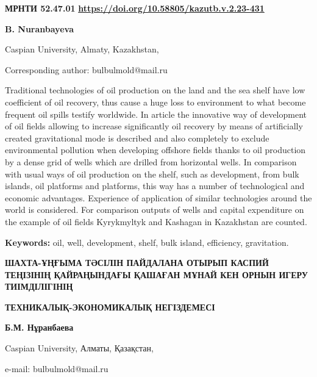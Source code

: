 \newpage
{\bfseries МРНТИ 52.47.01}
\hfill {\bfseries \href{https://doi.org/10.58805/kazutb.v.2.23-431}{https://doi.org/10.58805/kazutb.v.2.23-431}}


\begin{center}
{\bfseries B. Nuranbayeva}

Caspian University, Almaty, Kazakhstan,

\envelope Corresponding author: bulbulmold@mail.ru
\end{center}

Traditional technologies of oil production on the land and the sea shelf
have low coefficient of oil recovery, thus cause a huge loss to
environment to what become frequent oil spills testify worldwide. In
article the innovative way of development of oil fields allowing to
increase significantly oil recovery by means of artificially created
gravitational mode is described and also completely to exclude
environmental pollution when developing offshore fields thanks to oil
production by a dense grid of wells which are drilled from horizontal
wells. In comparison with usual ways of oil production on the shelf,
such as development, from bulk islands, oil platforms and platforms,
this way has a number of technological and economic advantages.
Experience of application of similar technologies around the world is
considered. For comparison outputs of wells and capital expenditure on
the example of oil fields Kyrykmyltyk and Kashagan in Kazakhstan are
counted.

{\bfseries Keywords:} oil, well, development, shelf, bulk island,
efficiency, gravitation.

\begin{center}
{\large\bfseries ШАХТА-ҰҢҒЫМА ТӘСІЛІН ПАЙДАЛАНА ОТЫРЫП КАСПИЙ ТЕҢІЗІНІҢ
ҚАЙРАҢЫНДАҒЫ ҚАШАҒАН МҰНАЙ КЕН ОРНЫН ИГЕРУ ТИІМДІЛІГІНІҢ}

{\bfseries ТЕХНИКАЛЫҚ-ЭКОНОМИКАЛЫҚ НЕГІЗДЕМЕСІ}

{\bfseries Б.М. Нұранбаева}

Caspian University, Алматы, Қазақстан,

e-mail: bulbulmold@mail.ru
\end{center}

